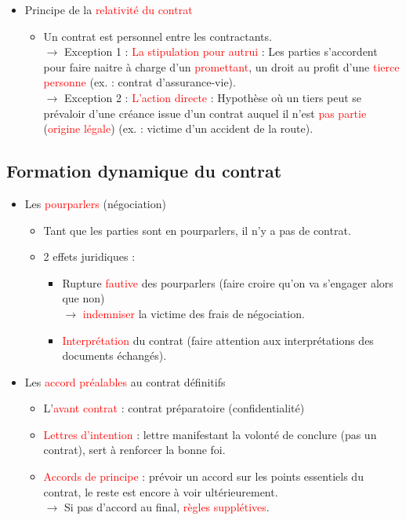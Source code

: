 \begin{itemize}
\begin{itemize}
\begin{itemize}
		\end{itemize}
	\end{itemize}
	\item Principe de la \textcolor{red}{relativité du contrat}
	\begin{itemize}
		\item Un contrat est personnel entre les contractants.\\
		$\rightarrow$ Exception 1 : \textcolor{red}{La stipulation pour autrui} : Les parties s'accordent pour faire naitre à charge d'un \textcolor{red}{promettant}, un droit au profit d'une \textcolor{red}{tierce personne} (ex. : contrat d'assurance-vie).\\
		$\rightarrow$ Exception 2 : \textcolor{red}{L'action directe} : Hypothèse où un tiers peut se prévaloir d'une créance issue d'un contrat auquel il n'est \textcolor{red}{pas partie} (\textcolor{red}{origine légale}) (ex. : victime d'un accident de la route).
	\end{itemize}
\end{itemize}

\subsection{Formation dynamique du contrat}

\begin{itemize}
	\item Les \textcolor{red}{pourparlers} (négociation)
	\begin{itemize}
		\item Tant que les parties sont en pourparlers, il n'y a pas de contrat.
		\item 2 effets juridiques :
		\begin{itemize}
			\item Rupture \textcolor{red}{fautive} des pourparlers (faire croire qu'on va s'engager alors que non)\\
			$\rightarrow$ \textcolor{red}{indemniser} la victime des frais de négociation.
			\item \textcolor{red}{Interprétation} du contrat (faire attention aux interprétations des documents échangés).
		\end{itemize}
	\end{itemize}
	\item Les \textcolor{red}{accord préalables} au contrat définitifs
	\begin{itemize}
		\item L'\textcolor{red}{avant contrat} : contrat préparatoire (confidentialité)
		\item \textcolor{red}{Lettres d'intention} : lettre manifestant la volonté de conclure (pas un contrat), sert à renforcer la bonne foi.
		\item \textcolor{red}{Accords de principe} : prévoir un accord sur les points essentiels du contrat, le reste est encore à voir ultérieurement.\\
		$\rightarrow$ Si pas d'accord au final, \textcolor{red}{règles supplétives}.
	\end{itemize}
\end{itemize}

